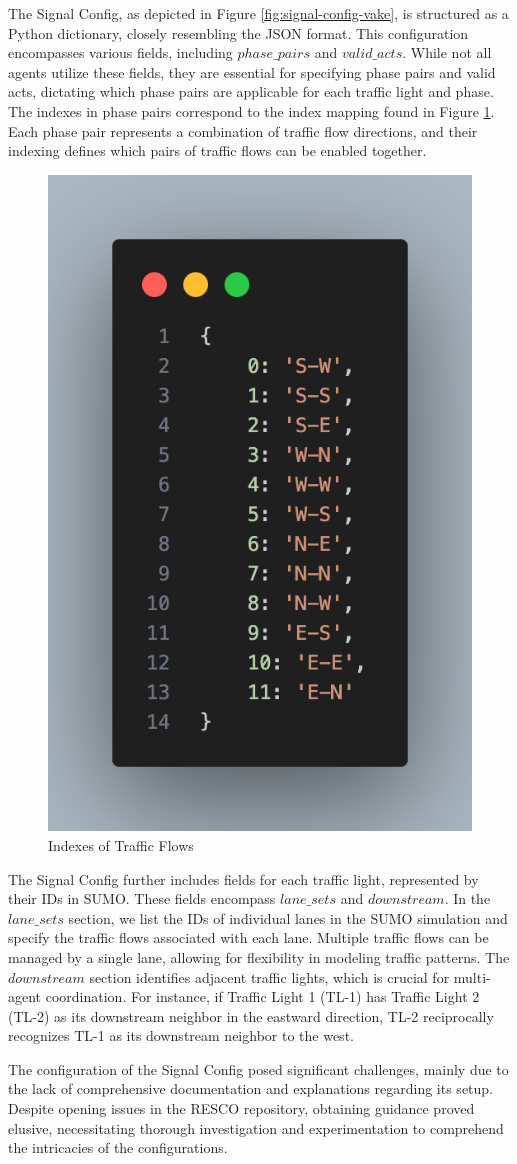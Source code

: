 The Signal Config, as depicted in Figure \ref{fig:signal-config-vake}, is structured as a Python dictionary, closely resembling the JSON format. This configuration encompasses various fields, including $phase\_pairs$ and $valid\_acts$. While not all agents utilize these fields, they are essential for specifying phase pairs and valid acts, dictating which phase pairs are applicable for each traffic light and phase. The indexes in phase pairs correspond to the index mapping found in Figure \ref{fig:index-trafficbound-mapping}. Each phase pair represents a combination of traffic flow directions, and their indexing defines which pairs of traffic flows can be enabled together.

\begin{figure}[h]
    \centering
    \includegraphics[width=0.3\linewidth]{images/methodology/index-trafficbound-mapping.png}
    \caption{Indexes of Traffic Flows}
    \label{fig:index-trafficbound-mapping}
\end{figure}

The Signal Config further includes fields for each traffic light, represented by their IDs in SUMO. These fields encompass $lane\_sets$ and $downstream$. In the $lane\_sets$ section, we list the IDs of individual lanes in the SUMO simulation and specify the traffic flows associated with each lane. Multiple traffic flows can be managed by a single lane, allowing for flexibility in modeling traffic patterns. The $downstream$ section identifies adjacent traffic lights, which is crucial for multi-agent coordination. For instance, if Traffic Light 1 (TL-1) has Traffic Light 2 (TL-2) as its downstream neighbor in the eastward direction, TL-2 reciprocally recognizes TL-1 as its downstream neighbor to the west.

The configuration of the Signal Config posed significant challenges, mainly due to the lack of comprehensive documentation and explanations regarding its setup. Despite opening issues in the RESCO repository, obtaining guidance proved elusive, necessitating thorough investigation and experimentation to comprehend the intricacies of the configurations.

